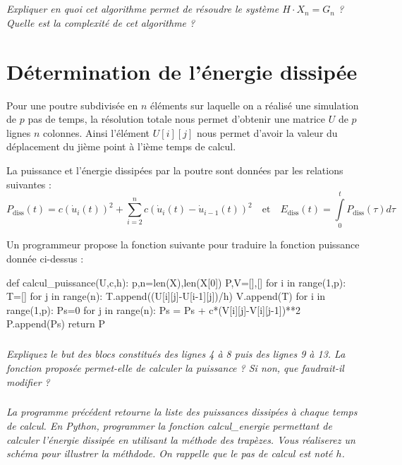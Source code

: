 \documentclass[10pt]{article}
\newif\ifprof
\begin{document}
\fi

\subparagraph{}
\textit{Expliquer en quoi cet algorithme permet de résoudre le système $H\cdot X_n = G_n$ ? Quelle est la complexité de cet algorithme ?}
\ifprof
\begin{corrige}
\end{corrige}
\else
\fi


\section{Détermination de l'énergie dissipée}
\ifprof
\else

Pour une poutre subdivisée en $n$ éléments sur laquelle on a réalisé une simulation de $p$ pas de temps, la résolution totale nous permet d'obtenir une matrice $U$ de $p$ lignes $n$ colonnes. Ainsi l'élément $U[i][j]$ nous permet d'avoir la valeur du déplacement du jième point à l'ième temps de calcul.

La puissance et l'énergie dissipées par la poutre sont données par les relations suivantes :
$$
P_{\text{diss}}(t) = c(\dot{u}_i(t))^2 + \sum\limits_{i=2}^n c\left(\dot{u}_i(t) - \dot{u}_{i-1}(t)\right)^2
\quad \text{et} \quad 
E_{\text{diss}}(t) = \int\limits_{0}^t P_{\text{diss}}(\tau) d\tau
$$


Un programmeur propose la fonction suivante pour traduire la fonction puissance donnée ci-dessus :
\begin{py}
\begin{python}
def calcul_puissance(U,c,h):
    p,n=len(X),len(X[0])
    P,V=[],[]
    for i in range(1,p):
        T=[]
        for j in range(n):
            T.append((U[i][j]-U[i-1][j])/h)
        V.append(T)
    for i in range(1,p):
        Ps=0
        for j in range(n):
                Ps = Ps + c*(V[i][j]-V[i][j-1])**2
        P.append(Ps)
    return P
\end{python}
\end{py}

\fi

\subparagraph{}
\textit{Expliquez le but des blocs constitués des lignes 4 à 8 puis des lignes 9 à 13. La fonction proposée permet-elle de calculer la puissance ? Si non, que faudrait-il modifier ? }
\ifprof
\begin{corrige}
\end{corrige}
\else
\fi


\subparagraph{}\textit{La programme précédent retourne la liste des puissances dissipées à chaque temps de calcul. En Python, programmer la fonction \textsf{calcul\_energie} permettant de calculer l'énergie dissipée en utilisant la méthode des trapèzes. Vous réaliserez un schéma pour illustrer la méthdode. On rappelle que le pas de calcul est noté $h$.}
\ifprof

\begin{corrige}
\end{corrige}
\else
\fi
\end{document}
